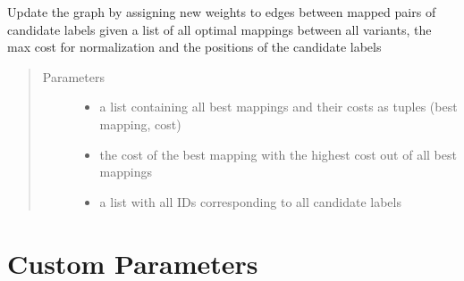 \documentclass[letterpaper,10pt,english]{sphinxmanual}
\begin{document}
\begin{fulllineitems}
\begin{fulllineitems}
\label{\detokenize{graph:graph.graphTool.graphTool.addOptimalMappings}}
Update the graph by assigning new weights to edges between mapped pairs of candidate labels given a list of all optimal mappings between all variants, the max cost for normalization and the positions of the candidate labels
\begin{quote}\begin{description}
\item[{Parameters}] \leavevmode\begin{itemize}
\item {} 
 \textendash{} a list containing all best mappings and their costs as tuples (best mapping, cost)

\item {} 
 \textendash{} the cost of the best mapping with the highest cost out of all best mappings

\item {} 
 \textendash{} a list with all IDs corresponding to all candidate labels

\end{itemize}

\end{description}\end{quote}

\end{fulllineitems}


\end{fulllineitems}


\begin{DUlineblock}{0em}
\item[] 
\end{DUlineblock}

{\hyperref[\detokenize{index:mastertoc}]{}}


\chapter{Custom Parameters}
\label{\detokenize{customParameters:custom-parameters}}\label{\detokenize{customParameters::doc}}
\begin{DUlineblock}{0em}
\item[] 
\end{DUlineblock}
\end{document}
